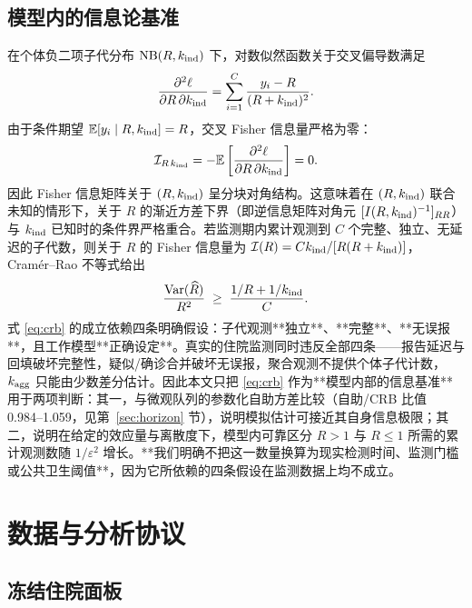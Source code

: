 \documentclass[11pt,a4paper]{article}
\begin{document}
\subsection{模型内的信息论基准}

在个体负二项子代分布 $\mathrm{NB}(R,k_{\rm ind})$ 下，对数似然函数关于交叉偏导数满足
\begin{equation}
\frac{\partial^2\ell}{\partial R\,\partial k_{\rm ind}} = \sum_{i=1}^C \frac{y_i - R}{(R+k_{\rm ind})^2}.
\end{equation}
由于条件期望 $\mathbb E[y_i \mid R, k_{\rm ind}] = R$，交叉 Fisher 信息量严格为零：
\begin{equation}
\mathcal I_{R\,k_{\rm ind}} = -\mathbb E\left[\frac{\partial^2\ell}{\partial R\,\partial k_{\rm ind}}\right] = 0.
\end{equation}
因此 Fisher 信息矩阵关于 $(R, k_{\rm ind})$ 呈分块对角结构。这意味着在 $(R, k_{\rm ind})$ 联合未知的情形下，关于 $R$ 的渐近方差下界（即逆信息矩阵对角元 $[I(R, k_{\rm ind})^{-1}]_{RR}$）与 $k_{\rm ind}$ 已知时的条件界严格重合\citep{lloyd-smith2005superspreading,lloyd-smith2007fisher}。若监测期内累计观测到 $C$ 个完整、独立、无延迟的子代数，则关于 $R$ 的 Fisher 信息量为 $\mathcal I(R)=C k_{\rm ind}/[R(R+k_{\rm ind})]$，Cramér--Rao 不等式给出
\begin{equation}
\frac{\operatorname{Var}(\widehat R)}{R^2}\;\ge\;\frac{1/R+1/k_{\rm ind}}{C} .
\label{eq:crb}
\end{equation}
式 \eqref{eq:crb} 的成立依赖四条明确假设：子代观测**独立**、**完整**、**无误报**，且工作模型**正确设定**。真实的住院监测同时违反全部四条——报告延迟与回填破坏完整性，疑似/确诊合并破坏无误报，聚合观测不提供个体子代计数，$k_{\rm agg}$ 只能由少数差分估计。因此本文只把 \eqref{eq:crb} 作为**模型内部的信息基准**用于两项判断：其一，与微观队列的参数化自助方差比较（自助/CRB 比值 0.984--1.059，见第~\ref{sec:horizon} 节），说明模拟估计可接近其自身信息极限；其二，说明在给定的效应量与离散度下，模型内可靠区分 $R>1$ 与 $R\le1$ 所需的累计观测数随 $1/\varepsilon^2$ 增长。**我们明确不把这一数量换算为现实检测时间、监测门槛或公共卫生阈值**，因为它所依赖的四条假设在监测数据上均不成立。



\section{数据与分析协议}

\subsection{冻结住院面板}
\end{document}
